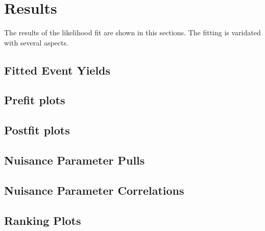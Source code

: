 \chapter{Results}

The results of the likelihood fit are shown in this sections. The fitting is varidated with several aspects.

\section{Fitted Event Yields}
\section{Prefit plots}
\section{Postfit plots}
\section{Nuisance Parameter Pulls}
\section{Nuisance Parameter Correlations}
\section{Ranking Plots}

